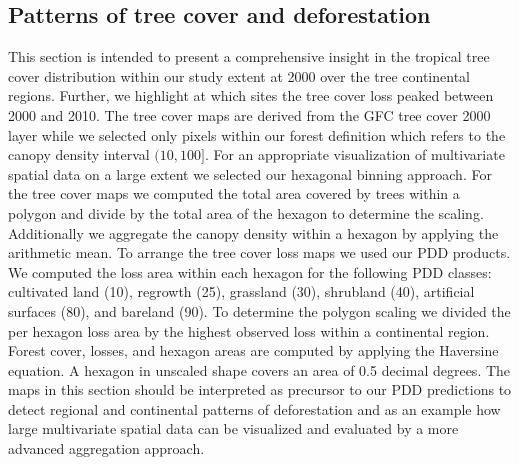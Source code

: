 		\subsection{Patterns of tree cover and deforestation}
		\label{subsec:results_tree_cover_and_deforestation}
			This section is intended to present a comprehensive insight in the tropical tree cover distribution within our study extent at 2000 over the tree continental regions. Further, we highlight at which sites the tree cover loss peaked between 2000 and 2010. The tree cover maps are derived from the \ac{GFC} tree cover 2000 layer while we selected only pixels within our forest definition which refers to the canopy density interval $(10,100]$. For an appropriate visualization of multivariate spatial data on a large extent we selected our hexagonal binning approach. For the tree cover maps we computed the total area covered by trees within a polygon and divide by the total area of the hexagon to determine the scaling. Additionally we aggregate the canopy density within a hexagon by applying the arithmetic mean. To arrange the tree cover loss maps we used our \ac{PDD} products. We computed the loss area within each hexagon for the following \ac{PDD} classes: cultivated land (10), regrowth (25), grassland (30), shrubland (40), artificial surfaces (80), and bareland (90). To determine the polygon scaling we divided the per hexagon loss area by the highest observed loss within a continental region. Forest cover, losses, and hexagon areas are computed by applying the Haversine equation. A hexagon in unscaled shape covers an area of 0.5 decimal degrees. The maps in this section should be interpreted as precursor to our \ac{PDD} predictions to detect regional and continental patterns of deforestation and as an example how large multivariate spatial data can be visualized and evaluated by a more advanced aggregation approach.

